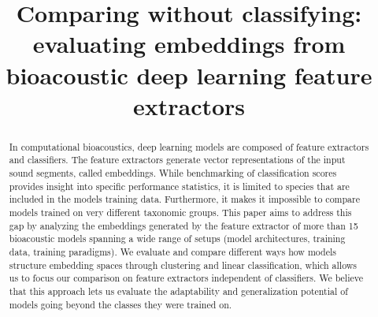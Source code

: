 \documentclass[11pt]{article}
\title{Comparing without classifying: evaluating embeddings from bioacoustic deep learning feature extractors}
\begin{document}
%
\maketitle
\begin{abstract}
In computational bioacoustics, deep learning models are composed of feature extractors and classifiers. 
The feature extractors generate vector representations of the input sound segments, called embeddings. 
While benchmarking of classification scores provides insight into specific performance statistics, it is limited to species that are included in the models training data. Furthermore, it makes it impossible to compare models trained on very different taxonomic groups. 
This paper aims to address this gap by analyzing the embeddings generated by the feature extractor of more than 15 bioacoustic models spanning a wide range of setups (model architectures, training data, training paradigms). 
We evaluate and compare different ways how models structure embedding spaces through clustering and linear classification, which allows us to focus our comparison on feature extractors independent of classifiers. 
We believe that this approach lets us evaluate the adaptability and generalization potential of models going beyond the classes they were trained on.
\end{abstract}
\end{document}
